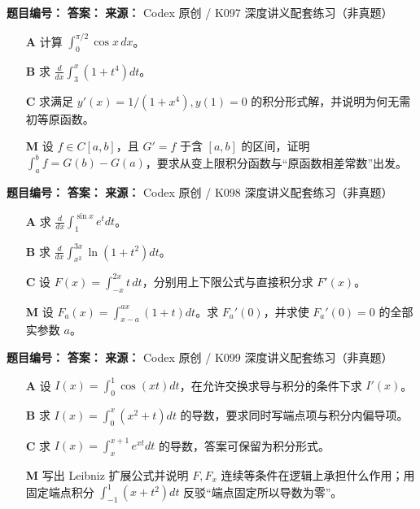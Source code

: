 \begin{problemBox}
\begin{problemMeta}
\textbf{题目编号：}  \quad
\textbf{答案：}  \quad
\textbf{来源：} Codex 原创 / K097 深度讲义配套练习（非真题）
\end{problemMeta}
\begin{enumerate}
  \item[\textbf{A}] 计算 \(\int_0^{\pi/2}\cos x\,dx\)。
  \item[\textbf{B}] 求 \(\frac d{dx}\int_3^x(1+t^4)dt\)。
  \item[\textbf{C}] 求满足 \(y'(x)=1/(1+x^4),y(1)=0\) 的积分形式解，并说明为何无需初等原函数。
  \item[\textbf{M}] 设 \(f\in C[a,b]\)，且 \(G'=f\) 于含 \([a,b]\) 的区间，证明 \(\int_a^bf=G(b)-G(a)\)，要求从变上限积分函数与“原函数相差常数”出发。
\end{enumerate}
\end{problemBox}

\begin{problemBox}
\begin{problemMeta}
\textbf{题目编号：}  \quad
\textbf{答案：}  \quad
\textbf{来源：} Codex 原创 / K098 深度讲义配套练习（非真题）
\end{problemMeta}
\begin{enumerate}
  \item[\textbf{A}] 求 \(\frac d{dx}\int_1^{\sin x}e^t dt\)。
  \item[\textbf{B}] 求 \(\frac d{dx}\int_{x^2}^{3x}\ln(1+t^2)dt\)。
  \item[\textbf{C}] 设 \(F(x)=\int_{-x}^{2x}t\,dt\)，分别用上下限公式与直接积分求 \(F'(x)\)。
  \item[\textbf{M}] 设 \(F_a(x)=\int_{x-a}^{ax}(1+t)dt\)。求 \(F_a'(0)\)，并求使 \(F_a'(0)=0\) 的全部实参数 \(a\)。
\end{enumerate}
\end{problemBox}

\begin{problemBox}
\begin{problemMeta}
\textbf{题目编号：}  \quad
\textbf{答案：}  \quad
\textbf{来源：} Codex 原创 / K099 深度讲义配套练习（非真题）
\end{problemMeta}
\begin{enumerate}
  \item[\textbf{A}] 设 \(I(x)=\int_0^1\cos(xt)dt\)，在允许交换求导与积分的条件下求 \(I'(x)\)。
  \item[\textbf{B}] 求 \(I(x)=\int_0^x(x^2+t)dt\) 的导数，要求同时写端点项与积分内偏导项。
  \item[\textbf{C}] 求 \(I(x)=\int_x^{x+1}e^{xt}dt\) 的导数，答案可保留为积分形式。
  \item[\textbf{M}] 写出 Leibniz 扩展公式并说明 \(F,F_x\) 连续等条件在逻辑上承担什么作用；用固定端点积分 \(\int_{-1}^{1}(x+t^2)dt\) 反驳“端点固定所以导数为零”。
\end{enumerate}
\end{problemBox}

